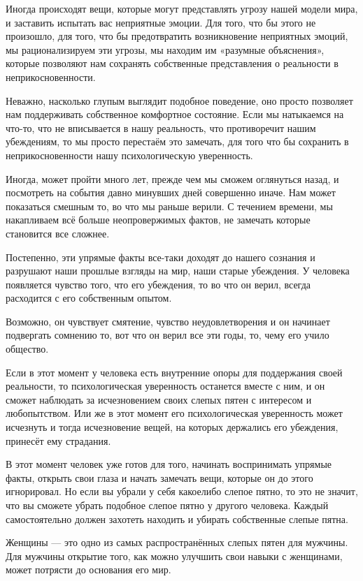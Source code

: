 Иногда происходят вещи, которые могут представлять угрозу нашей модели мира, и заставить испытать вас неприятные эмоции. Для того, что бы этого не произошло, для того, что бы предотвратить возникновение неприятных эмоций, мы рационализируем эти угрозы, мы находим им «разумные объяснения», которые позволяют нам сохранять собственные представления о реальности в неприкосновенности.

Неважно, насколько глупым выглядит подобное поведение, оно просто позволяет нам поддерживать собственное комфортное состояние. Если мы натыкаемся на что-то, что не вписывается в нашу реальность, что противоречит нашим убеждениям, то мы просто перестаём это замечать, для того что бы сохранить в неприкосновенности нашу психологическую уверенность.

Иногда, может пройти много лет, прежде чем мы сможем оглянуться назад, и посмотреть на события давно минувших дней совершенно иначе. Нам может показаться смешным то, во что мы раньше верили. С течением времени, мы накапливаем всё больше неопровержимых фактов, не замечать которые становится все сложнее.

Постепенно, эти упрямые факты все-таки доходят до нашего сознания и разрушают наши прошлые взгляды на мир, наши старые убеждения. У человека появляется чувство того, что его убеждения, то во что он верил, всегда расходится с его собственным опытом.

Возможно, он чувствует смятение, чувство неудовлетворения и он начинает подвергать сомнению то, вот что он верил все эти годы, то, чему его учило общество.

Если в этот момент у человека есть внутренние опоры для поддержания своей реальности, то психологическая уверенность останется вместе с ним, и он сможет наблюдать за исчезновением своих слепых пятен с интересом и любопытством. Или же в этот момент его психологическая уверенность может исчезнуть и тогда исчезновение вещей, на которых держались его убеждения, принесёт ему страдания.

В этот момент человек уже готов для того, начинать воспринимать упрямые факты, открыть свои глаза и начать замечать вещи, которые он до этого игнорировал. Но если вы убрали у себя какоелибо слепое пятно, то это не значит, что вы сможете убрать подобное слепое пятно у другого человека. Каждый самостоятельно должен захотеть находить и убирать собственные слепые пятна.

Женщины --- это одно из самых распространённых слепых пятен для мужчины. Для мужчины открытие того, как можно улучшить свои навыки с женщинами, может потрясти до основания его мир.

